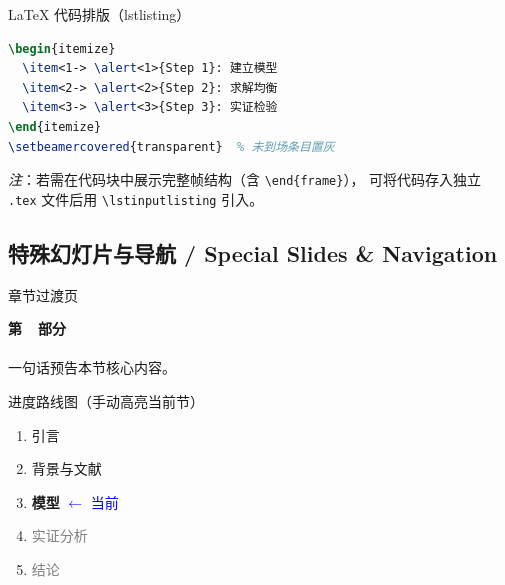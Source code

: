 \begin{frame}[fragile]{LaTeX 代码排版（lstlisting）}
  \begin{lstlisting}[language=TeX, caption={帧内叠加动画（内部代码）}]
% 以下内容放在 frame 环境内部（外层为 \begin{frame}...\end{...} 结构）：
\begin{itemize}
  \item<1-> \alert<1>{Step 1}: 建立模型
  \item<2-> \alert<2>{Step 2}: 求解均衡
  \item<3-> \alert<3>{Step 3}: 实证检验
\end{itemize}
\setbeamercovered{transparent}  % 未到场条目置灰
  \end{lstlisting}
  {\footnotesize\textit{注}：若需在代码块中展示完整帧结构（含 \texttt{\textbackslash end\{frame\}}），
  可将代码存入独立 \texttt{.tex} 文件后用 \texttt{\textbackslash lstinputlisting} 引入。}
\end{frame}

\subsection{特殊幻灯片与导航 / Special Slides \& Navigation}

\begin{frame}{章节过渡页}
  \vspace*{\fill}
  \begin{center}
    {\Large \textbf{第~~部分}}\\[0.7em]
    {\large \insertsectionhead}\\[1.2em]
    {\normalsize 一句话预告本节核心内容。}
  \end{center}
  \vspace*{\fill}
\end{frame}

\begin{frame}{进度路线图（手动高亮当前节）}
  \begin{enumerate}
    \item[\checkmark] 引言
    \item[\checkmark] 背景与文献
    \item[\textbf{3.}] \textbf{模型} \quad \textcolor{blue}{$\leftarrow$ 当前}
    \item[4.] \textcolor{gray}{实证分析}
    \item[5.] \textcolor{gray}{结论}
  \end{enumerate}
\end{frame}

